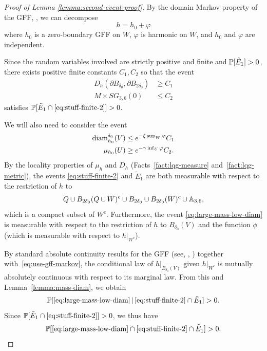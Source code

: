 \documentclass[12pt]{amsart}
\numberwithin{equation}{section}
\newcommand{\SGrho}[2]{\hyperref[eq:alternate-size-2]{SG_{#1}(#2)}}
\begin{document}
	\begin{proof}[Proof of Lemma \ref{lemma:second-event-proof}]
		By the domain Markov property of the GFF, \cite[Proposition 2.8]{miller2017imaginary}, we can decompose
		\begin{equation} \label{eq:use-gff-markov}
		h = h_0 + \varphi
		\end{equation}
		where $h_0$ is a zero-boundary GFF on $W$, $\varphi$ is harmonic on $W$,
		and $h_0$ and  $\varphi$ are independent. 
		
		Since the random variables involved are strictly positive and finite and $\P[\tilde E_1] > 0$, 
		there exists positive finite constants $C_1, C_2$ so that the event
		\begin{equation} \label{eq:stuff-finite-2}
		\begin{aligned}
		D_h(\partial B_{\delta_0}, \partial B_{2 \delta_0}) &\geq C_1 \\
		M \times \SGrho{3,6}{0} &\leq C_2
		\end{aligned}
		\end{equation}
		satisfies	$\P[\tilde E_1 \cap \eqref{eq:stuff-finite-2}] > 0$.
		
		We will also need to consider the event
		\begin{equation} \label{eq:large-mass-low-diam}
		\begin{aligned}
		\diam_{h_0}^{\delta_0}(V) &\leq e^{-\xi \sup_{W} \varphi} C_1 \\
		\mu_{h_0}(U) &\geq e^{-\gamma \inf_{U} \varphi} C_2 .
		\end{aligned}
		\end{equation} 
		By the locality properties of $\mu_h$ and $D_h$ (Facts~\ref{fact:lqg-measure} and~\ref{fact:lqg-metric}), the events \eqref{eq:stuff-finite-2} and $\tilde E_1$ are both measurable with respect to the restriction of $h$ to
		\[
		Q \cup B_{2 \delta_0}(Q \cup W)^c \cup B_{2 \delta_0} \cup B_{2 \delta_0}(W)^c  \cup \A_{3,6} ,
		\] 
		which is a compact subset of $W^c$. 
		Furthermore, the event \eqref{eq:large-mass-low-diam} is measurable with respect to the restriction of $h$ to $B_{\delta_0}(V)$ and the function $\phi$ (which is measurable with respect to $h|_{W^c}$). 
		
		
		By standard absolute continuity results 
		for the GFF (see, \eg, \cite[Proposition 3.4]{miller2016imaginary}) together with~\eqref{eq:use-gff-markov},
		the conditional law of $h|_{B_{\delta_0}(V)}$ given $h|_{W^c}$
		is mutually absolutely continuous with respect to its marginal law. 
		From this and Lemma~\ref{lemma:mass-diam}, we obtain
		\[
		\P[\eqref{eq:large-mass-low-diam} \,|\,  \eqref{eq:stuff-finite-2} \cap \tilde E_1] > 0 .
		\]
		Since $\P[\tilde E_1 \cap \eqref{eq:stuff-finite-2}] > 0$, we thus have
		\[
		\P[\eqref{eq:large-mass-low-diam} \cap \eqref{eq:stuff-finite-2} \cap \tilde E_1] > 0.
		\]
		

\end{proof}
\end{document}
